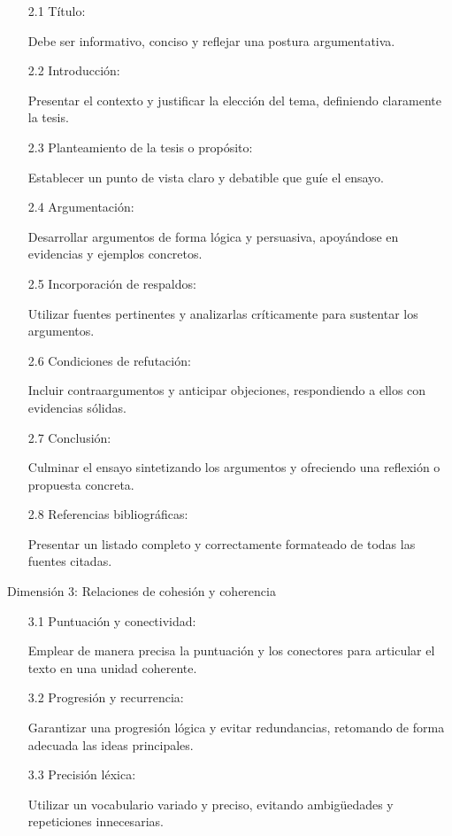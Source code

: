 \documentclass[spanish]{textolivre}
\begin{document}
\begin{enumerate}[label=\arabic*.\arabic*, leftmargin=*]
    \item[2.1] Título:
    \item[] Debe ser informativo, conciso y reflejar una postura argumentativa.
    
    \item[2.2] Introducción:
    \item[] Presentar el contexto y justificar la elección del tema, definiendo claramente la tesis.
    
    \item[2.3] Planteamiento de la tesis o propósito:
    \item[] Establecer un punto de vista claro y debatible que guíe el ensayo.
    
    \item[2.4] Argumentación:
    \item[] Desarrollar argumentos de forma lógica y persuasiva, apoyándose en evidencias y ejemplos concretos.
    
    \item[2.5] Incorporación de respaldos:
    \item[] Utilizar fuentes pertinentes y analizarlas críticamente para sustentar los argumentos.
    
    \item[2.6] Condiciones de refutación:
    \item[] Incluir contraargumentos y anticipar objeciones, respondiendo a ellos con evidencias sólidas.
    
    \item[2.7] Conclusión:
    \item[] Culminar el ensayo sintetizando los argumentos y ofreciendo una reflexión o propuesta concreta.
    
    \item[2.8] Referencias bibliográficas:
    \item[] Presentar un listado completo y correctamente formateado de todas las fuentes citadas.
\end{enumerate}

\medskip

\noindent Dimensión 3: Relaciones de cohesión y coherencia

\begin{enumerate}[label=\arabic*.\arabic*, leftmargin=*]
    \item[3.1] Puntuación y conectividad:
    \item[] Emplear de manera precisa la puntuación y los conectores para articular el texto en una unidad coherente.
    
    \item[3.2] Progresión y recurrencia:
    \item[] Garantizar una progresión lógica y evitar redundancias, retomando de forma adecuada las ideas principales.
    
    \item[3.3] Precisión léxica:
    \item[] Utilizar un vocabulario variado y preciso, evitando ambigüedades y repeticiones innecesarias.
\end{enumerate}
\end{document}
